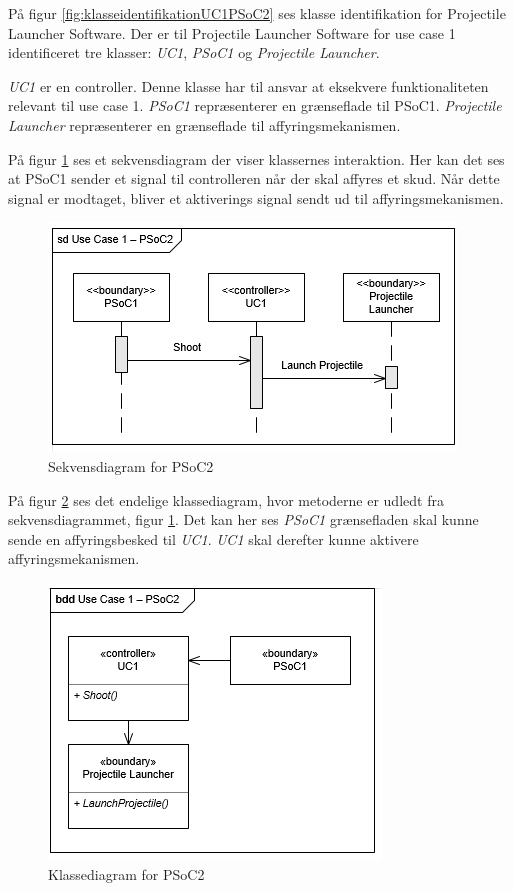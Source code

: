 På figur \ref{fig:klasseidentifikationUC1PSoC2} ses klasse identifikation for Projectile Launcher Software. Der er til Projectile Launcher Software for use case 1 identificeret tre klasser: \textit{UC1}, \textit{PSoC1} og \textit{Projectile Launcher}.

\textit{UC1} er en controller. Denne klasse har til ansvar at eksekvere funktionaliteten relevant til use case 1. \textit{PSoC1} repræsenterer en grænseflade til PSoC1. \textit{Projectile Launcher} repræsenterer en grænseflade til affyringsmekanismen.

På figur \ref{fig:sekvensUC1PSoC2} ses et sekvensdiagram der viser klassernes interaktion. Her kan det ses at PSoC1 sender et signal til controlleren når der skal affyres et skud. Når dette signal er modtaget, bliver et aktiverings signal sendt ud til affyringsmekanismen.

\begin{figure}[H]
	\centering
	\includegraphics[scale=0.8]{Systemarkitektur/images/UC1PSoC2SequenceDiagram}
	\caption{Sekvensdiagram for PSoC2}
	\label{fig:sekvensUC1PSoC2}
\end{figure}

På figur \ref{fig:klasseUC1PSoC2} ses det endelige klassediagram, hvor metoderne er udledt fra sekvensdiagrammet, figur \ref{fig:sekvensUC1PSoC2}. Det kan her ses \textit{PSoC1} grænsefladen skal kunne sende en affyringsbesked til \textit{UC1}. \textit{UC1} skal derefter kunne aktivere affyringsmekanismen. 

\begin{figure}[H]
	\centering
	\includegraphics[scale=0.8]{Systemarkitektur/images/klasseUC1PSoC2}
	\caption{Klassediagram for PSoC2}
	\label{fig:klasseUC1PSoC2}
\end{figure}


